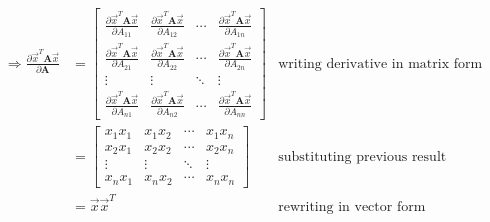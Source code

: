 \documentclass[11pt, fleqn]{article}
\newcommand{\pd}[2]{\frac{\partial #1}{\partial #2}}
\begin{document}
\begin{enumerate}
\begin{align*}
        \Rightarrow \pd{\vec{x}^T \textbf{A} \vec{x}}{\textbf{A}} &= \begin{bmatrix}
            \pd{\vec{x}^T \textbf{A} \vec{x}}{A_{11}} & \pd{\vec{x}^T \textbf{A} \vec{x}}{A_{12}} & \cdots & \pd{\vec{x}^T \textbf{A} \vec{x}}{A_{1n}} \\
            \pd{\vec{x}^T \textbf{A} \vec{x}}{A_{21}} & \pd{\vec{x}^T \textbf{A} \vec{x}}{A_{22}} & \cdots & \pd{\vec{x}^T \textbf{A} \vec{x}}{A_{2n}} \\
            \vdots & \vdots & \ddots & \vdots \\
            \pd{\vec{x}^T \textbf{A} \vec{x}}{A_{n1}} & \pd{\vec{x}^T \textbf{A} \vec{x}}{A_{n2}} & \cdots & \pd{\vec{x}^T \textbf{A} \vec{x}}{A_{nn}}
        \end{bmatrix} & \text{writing derivative in matrix form} \\
        &= \begin{bmatrix}
            x_1 x_1 & x_1 x_2 & \cdots & x_1 x_n \\
            x_2 x_1 & x_2 x_2 & \cdots & x_2 x_n \\
            \vdots & \vdots & \ddots & \vdots \\
            x_n x_1 & x_n x_2 & \cdots & x_n x_n
        \end{bmatrix} & \text{substituting previous result} \\
        &= \vec{x} \vec{x}^T & \text{rewriting in vector form} \\
    \end{align*}
\end{enumerate}

\newpage
\end{document}
